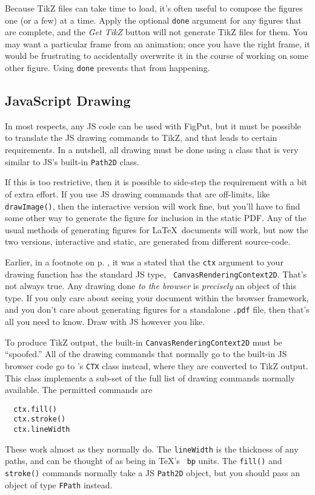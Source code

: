 \documentclass[10pt]{article}
\begin{document}
Because TikZ files can take time to load, it's often useful to
compose the figures one (or a few) at a time. Apply the optional
{\tt done} argument for any figures that are complete, and the
\emph{Get TikZ} button will not generate TikZ files for them. You may
want a particular frame from an animation; once you have the right
frame, it would be frustrating to accidentally overwrite it in the course of 
working on some other figure. Using {\tt done} prevents that from happening.

\subsection{JavaScript Drawing}

In most respects, any JS code can be used with FigPut, but it must be
possible to translate the JS drawing commands to TikZ, and that leads
to certain requirements. In a nutshell, all drawing must be done using a
class that is very similar to JS's built-in {\tt Path2D} class. 

If this is too restrictive, then it is possible to side-step the
requirement with a bit of extra effort. If you use JS drawing commands
that are off-limits, like {\tt drawImage()}, then the interactive version
will work fine, but you'll have to find some other way to generate the
figure for inclusion in the static PDF. Any of the usual methods of
generating figures for \LaTeX\ documents will work, but now the two
versions, interactive and static, are generated from different
source-code.

Earlier, in a footnote on p. \pageref{page-ctx}, it was a stated that
the {\tt ctx} argument to your drawing function has the standard JS type, {\tt
  CanvasRenderingContext2D}. That's not always true. Any drawing
done \emph{to the browser} is \emph{precisely} an object of this
type. If you only care about seeing your document within the browser
framework, and you don't care about generating figures for a
standalone {\tt .pdf} file, then that's all you need to know. Draw
with JS however you like. 

To produce TikZ output, the built-in {\tt CanvasRenderingContext2D}
must be ``spoofed.'' All of the drawing commands that normally go to
the built-in JS browser code go to \figput's {\tt CTX} class
instead, where they are converted to TikZ output.
This class implements a sub-set of the full list of drawing
commands normally available. The permitted commands are
\begin{verbatim}
  ctx.fill()
  ctx.stroke()
  ctx.lineWidth
\end{verbatim}
These work almost as they normally do. The {\tt lineWidth} is the
thickness of any paths, and can be thought of as being in \TeX's {\tt
  bp} units. The {\tt fill()} and {\tt stroke()} commands normally
take a JS {\tt Path2D} object, but you should pass an object of type
{\tt FPath} instead.
\end{document}
